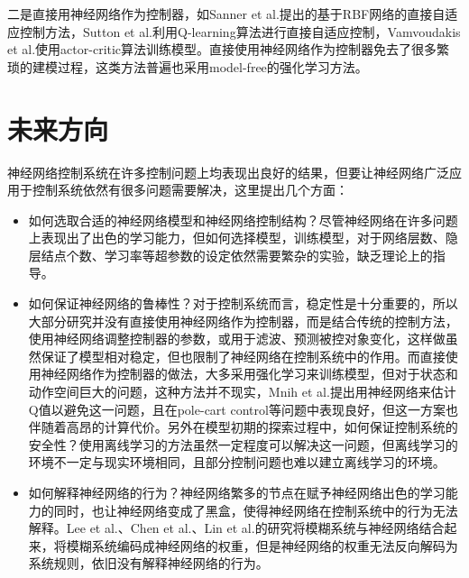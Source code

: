 \documentclass[12pt,onecolumn,letterpaper]{article}
\begin{document}
    二是直接用神经网络作为控制器，如Sanner et al.\cite{sanner1991gaussian}提出的基于RBF网络的直接自适应控制方法，Sutton et al.\cite{sutton1992reinforcement}利用Q-learning算法进行直接自适应控制，Vamvoudakis et al.\cite{vamvoudakis2010online}使用actor-critic算法训练模型。直接使用神经网络作为控制器免去了很多繁琐的建模过程，这类方法普遍也采用model-free的强化学习方法。


    \section{未来方向}
    神经网络控制系统在许多控制问题上均表现出良好的结果，但要让神经网络广泛应用于控制系统依然有很多问题需要解决，这里提出几个方面：
    \begin{itemize}
        \item 如何选取合适的神经网络模型和神经网络控制结构？尽管神经网络在许多问题上表现出了出色的学习能力，但如何选择模型，训练模型，对于网络层数、隐层结点个数、学习率等超参数的设定依然需要繁杂的实验，缺乏理论上的指导。
        \item 如何保证神经网络的鲁棒性？对于控制系统而言，稳定性是十分重要的，所以大部分研究并没有直接使用神经网络作为控制器，而是结合传统的控制方法，使用神经网络调整控制器的参数，或用于滤波、预测被控对象变化，这样做虽然保证了模型相对稳定，但也限制了神经网络在控制系统中的作用。而直接使用神经网络作为控制器的做法，大多采用强化学习来训练模型，但对于状态和动作空间巨大的问题，这种方法并不现实，Mnih et al.\cite{mnih2013playing}提出用神经网络来估计Q值以避免这一问题，且在pole-cart control等问题中表现良好，但这一方案也伴随着高昂的计算代价。另外在模型初期的探索过程中，如何保证控制系统的安全性？使用离线学习的方法虽然一定程度可以解决这一问题，但离线学习的环境不一定与现实环境相同，且部分控制问题也难以建立离线学习的环境。
        \item 如何解释神经网络的行为？神经网络繁多的节点在赋予神经网络出色的学习能力的同时，也让神经网络变成了黑盒，使得神经网络在控制系统中的行为无法解释。Lee et al.\cite{lee2000identification}、Chen et al.\cite{chen1995model}、Lin et al.\cite{lin1995new}的研究将模糊系统与神经网络结合起来，将模糊系统编码成神经网络的权重，但是神经网络的权重无法反向解码为系统规则，依旧没有解释神经网络的行为。
    \end{itemize}
    

    {\small
         
        
    }
\end{document}
